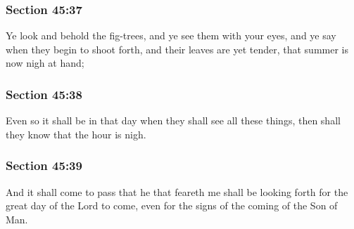 	\subsubsection{Section 45:37} %
		\label{DC45-37}

		Ye look and behold the fig-trees, and ye see them with your eyes, and ye say when they begin to shoot forth, and their leaves are yet tender, that summer is now nigh at hand;


	\subsubsection{Section 45:38} %
		\label{DC45-38}

		Even so it shall be in that day when they shall see all these things, then shall they know that the hour is nigh.


	\subsubsection{Section 45:39} %
		\label{DC45-39}

		And it shall come to pass that he that feareth me shall be looking forth for the great day of the Lord to come, even for the signs of the coming of the Son of Man.


